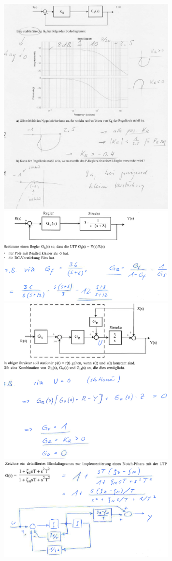 \begin{multicols}{2}
\includegraphics[width=9cm]{./images/beispiele/beispiel12.png}
\includegraphics[width=9cm]{./images/beispiele/beispiel13.png}
\includegraphics[width=9cm]{./images/beispiele/beispiel14.png}
\includegraphics[width=9cm]{./images/beispiele/beispiel15.png}

\end{multicols}
